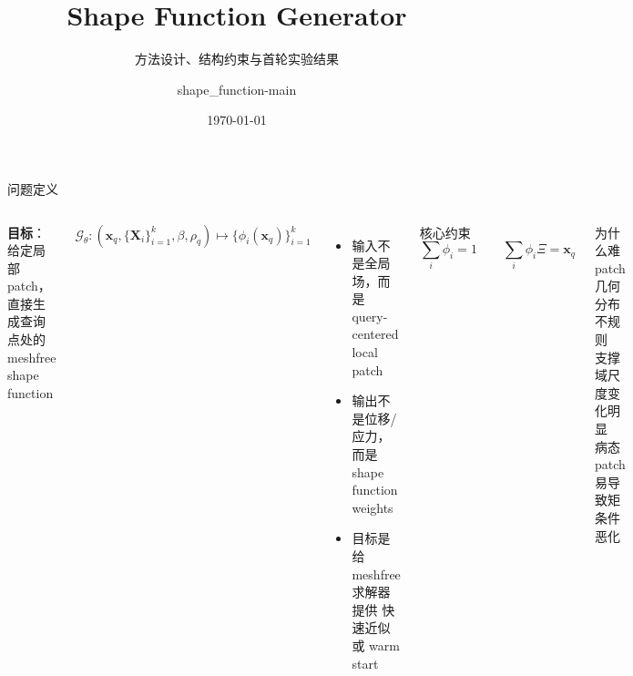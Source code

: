 \documentclass[10pt,aspectratio=169]{beamer}
\title{Shape Function Generator}
\subtitle{方法设计、结构约束与首轮实验结果}
\author{shape\_function-main}
\date{\today}
\newcommand{\xq}{\mathbf{x}_q}
\newcommand{\Xnode}{\mathbf{X}_i}
\newcommand{\phii}{\phi_i(\mathbf{x}_q)}
\begin{document}
\maketitle

\begin{frame}{问题定义}
  \begin{columns}[T,onlytextwidth]
      \textbf{目标}：给定局部 patch，直接生成查询点处的 meshfree shape function
      \vspace{0.6em}

      \[
      \mathcal{G}_{\theta}:
      \left(
      \xq,\{\Xnode\}_{i=1}^{k},\beta,\rho_q
      \right)
      \mapsto
      \{\phii\}_{i=1}^{k}
      \]

      \begin{itemize}
        \item 输入不是全局场，而是 \alert{query-centered local patch}
        \item 输出不是位移/应力，而是 \alert{shape function weights}
        \item 目标是给 meshfree 求解器提供 \alert{快速近似或 warm start}
      \end{itemize}

      \begin{block}{核心约束}
        \[
        \sum_i \phi_i = 1
        \qquad
        \sum_i \phi_i \Xi = \xq
        \]
      \end{block}

      \begin{alertblock}{为什么难}
        patch 几何分布不规则\\
        支撑域尺度变化明显\\
        病态 patch 易导致矩条件恶化
      \end{alertblock}
  \end{columns}
\end{frame}
\end{document}
